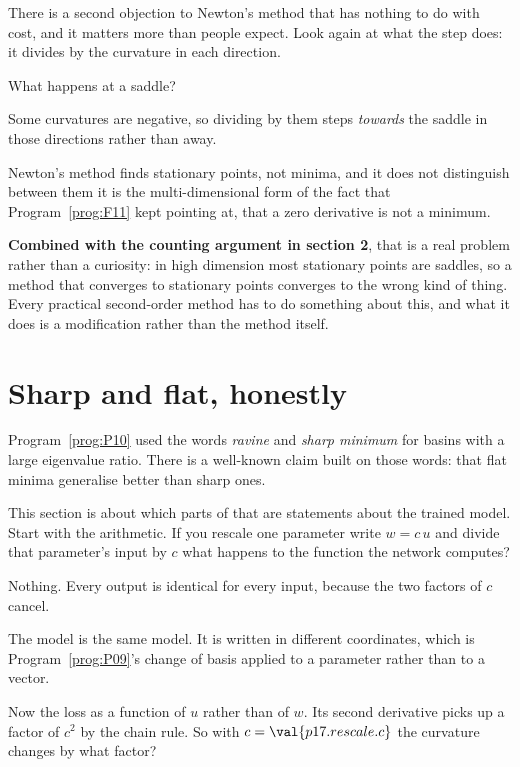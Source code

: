 \begin{fr}
There is a second objection to Newton's method that has nothing to do with
cost, and it matters more than people expect. Look again at what the step
does: it divides by the curvature in each direction.

What happens at a saddle?
\dotline
\nextframe
\end{fr}

\begin{fr}
\begin{ansblock}
Some curvatures are negative, so dividing by them steps \emph{towards} the
saddle in those directions rather than away.
\end{ansblock}

Newton's method finds stationary points, not minima, and it does not
distinguish between them \dash{} it is the multi-dimensional form of the fact
that Program~\ref{prog:F11} kept pointing at, that a zero derivative is not a
minimum.

\textbf{Combined with the counting argument in section 2}, that is a real
problem rather than a curiosity: in high dimension most stationary points are
saddles, so a method that converges to stationary points converges to the
wrong kind of thing. Every practical second-order method has to do something
about this, and what it does is a modification rather than the method itself.
\end{fr}

\section{Sharp and flat, honestly}
\label{sec:P17-sharpness}

\begin{fr}
Program~\ref{prog:P10} used the words \emph{ravine} and \emph{sharp minimum}
for basins with a large eigenvalue ratio. There is a well-known claim built on
those words: that flat minima generalise better than sharp ones.

This section is about which parts of that are statements about the trained
model. Start with the arithmetic. If you rescale one parameter \dash{} write
$w = c\,u$ and divide that parameter's input by $c$ \dash{} what happens to
the function the network computes?
\dotline
\nextframe
\end{fr}

\begin{fr}
\begin{ansblock}
Nothing. Every output is identical for every input, because the two factors of
$c$ cancel.
\end{ansblock}

The model is the same model. It is written in different coordinates, which is
Program~\ref{prog:P09}'s change of basis applied to a parameter rather than to
a vector.

Now the loss as a function of $u$ rather than of $w$. Its second derivative
picks up a factor of $c^{2}$ by the chain rule. So with $c = \val{p17.rescale.c}$
the curvature changes by what factor?
\nextframe
\end{fr}

